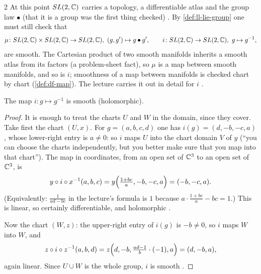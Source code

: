 \begin{paracol}{2}
At this point $SL(2,\mathbb{C})$ carries a topology, a differentiable atlas and the group law $\bullet$ (that it is a group was the first thing checked)  . By \cref{def:ll-lie-group} one must still check that
\[
  \mu\colon SL(2,\mathbb{C})\times SL(2,\mathbb{C})\to SL(2,\mathbb{C}),\ (g,g')\mapsto g\bullet g',\qquad i\colon SL(2,\mathbb{C})\to SL(2,\mathbb{C}),\ g\mapsto g^{-1},
\]
are smooth. The Cartesian product of two smooth manifolds inherits a smooth atlas from its factors (a problem-sheet fact), so $\mu$ is a map between smooth manifolds, and so is $i$; smoothness of a map between manifolds is checked chart by chart (\cref{def:df-map}). The lecture carries it out in detail for $i$           .
\begin{proposition}\label{prop:sl-inversion}
The map $i\colon g\mapsto g^{-1}$ is smooth (holomorphic).
\end{proposition}
\begin{proof}
It is enough to treat the charts $U$ and $W$ in the domain, since they cover.
Take first the chart $(U,x)$. For $g=(a,b,c,d)$ one has $i(g)=(d,-b,-c,a)$, whose lower-right entry is $a\ne0$: so $i$ maps $U$ into the chart domain $V$ of $y$ (``you can choose the charts independently, but you better make sure that you map into that chart''). The map in coordinates, from an open set of $\mathbb{C}^3$ to an open set of $\mathbb{C}^3$, is
\[
  y\circ i\circ x^{-1}(a,b,c)=y\Bigl(\tfrac{1+bc}{a},-b,-c,a\Bigr)=(-b,-c,a).
\]
(Equivalently: $\frac1{ad-bc}$ in the lecture's formula is $1$ because $a\cdot\frac{1+bc}{a}-bc=1$.) This is linear, so certainly differentiable, and holomorphic                     .\par
Now the chart $(W,z)$: the upper-right entry of $i(g)$ is $-b\ne0$, so $i$ maps $W$ into $W$, and
\[
  z\circ i\circ z^{-1}(a,b,d)=z\Bigl(d,-b,\tfrac{ad-1}{b}\cdot(-1),a\Bigr)=(d,-b,a),
\]
again linear. Since $U\cup W$ is the whole group, $i$ is smooth     .
\end{proof}

\end{paracol}
